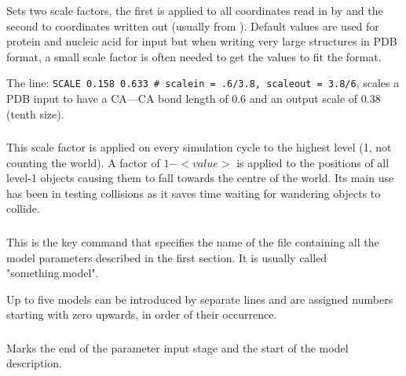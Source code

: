 \subsubsection{}

Sets two scale factors, the first is applied to all coordinates read in by  and the
second to coordinates written out (usually from ).  Default values are used for
protein and nucleic acid for input but when writing very large structures in PDB format, a
small scale factor is often needed to get the values to fit the format.

The line: {\tt SCALE 0.158 0.633  \# scalein = .6/3.8, scaleout = 3.8/6}, scales a PDB input
to have a CA---CA bond length of 0.6 and an output scale of 0.38 (tenth size).

\subsubsection{}

This scale factor is applied on every simulation cycle to the highest level (1, not counting
the world). A factor of $1-<value>$ is applied to the positions of all level-1 objects causing
them to fall towards the centre of the world.   Its main use has been in testing collisions
as it saves time waiting for wandering objects to collide.

\subsubsection{}

This is the key command that specifies the name of the file containing all the model parameters
described in the first section.  It is usually called "something.model".

Up to five models can be introduced by separate  lines and are assigned numbers
starting with zero upwards, in order of their occurrence.

\subsubsection{}

Marks the end of the parameter input stage and the start of the model description.




